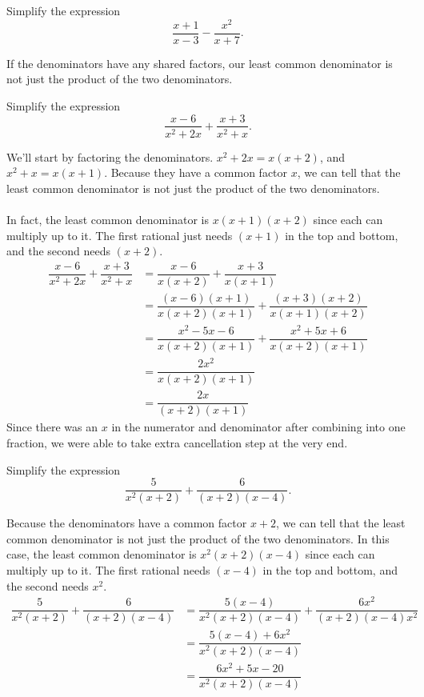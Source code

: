\documentclass{ximera}
\begin{document}
\begin{example}
	Simplify the expression \[ \dfrac{x+1}{x-3} - \dfrac{x^2}{x+7}. \]

  \begin{multipleChoice}
  \end{multipleChoice}
\end{example}

If the denominators have any shared factors, our least common denominator is not just the product of the two denominators.

\begin{example}
	Simplify the expression \[ \dfrac{x-6}{x^2+2x} + \dfrac{x+3}{x^2+x}. \]
	\begin{explanation}
		We'll start by factoring the denominators.  $x^2+2x = x(x+2)$, and $x^2+x = x(x+1)$. Because they have a common factor $x$, we can tell that the least common denominator is not just the product of the two denominators. \\\\In fact, the least common denominator is $x(x+1)(x+2)$ since each can multiply up to it. The first rational just needs $(x+1)$ in the top and bottom, and the second needs $(x+2)$.
		\begin{align*}
			\dfrac{x-6}{x^2+2x} + \dfrac{x+3}{x^2+x} &= \dfrac{x-6}{x(x+2)} + \dfrac{x+3}{x(x+1)}\\
				&= \dfrac{(x-6)(x+1)}{x(x+2)(x+1)} + \dfrac{(x+3)(x+2)}{x(x+1)(x+2)}\\
				&= \dfrac{x^2-5x-6}{x(x+2)(x+1)} + \dfrac{x^2+5x+6}{x(x+2)(x+1)}\\ 
				&= \dfrac{2x^2}{x(x+2)(x+1)}\\
				&= \dfrac{2x}{(x+2)(x+1)}
		\end{align*}
		Since there was an $x$ in the numerator and denominator after combining into one fraction, we were able to take extra cancellation step at the very end.
	\end{explanation}
\end{example}

\begin{example}
	Simplify the expression \[ \dfrac{5}{x^2(x+2)} + \dfrac{6}{(x+2)(x-4)}. \]
	\begin{explanation}
		Because the denominators have a common factor $x+2$, we can tell that the least common denominator is not just the product of the two denominators. In this case, the least common denominator is $x^2(x+2)(x-4)$ since each can multiply up to it. The first rational needs $(x-4)$ in the top and bottom, and the second needs $x^2$.
		\begin{align*}
			\dfrac{5}{x^2(x+2)} + \dfrac{6}{(x+2)(x-4)} 
			&= \dfrac{5(x-4)}{x^2(x+2)(x-4)} + \dfrac{6x^2}{(x+2)(x-4)x^2}\\
				&= \dfrac{5(x-4)+6x^2}{x^2(x+2)(x-4)}\\
				&= \dfrac{6x^2+5x-20}{x^2(x+2)(x-4)}
		\end{align*}
	\end{explanation}
\end{example}
\end{document}
